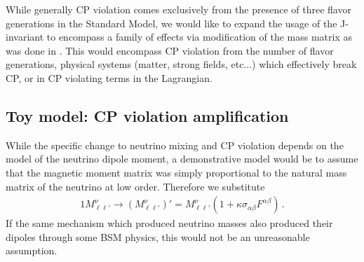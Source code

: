 While generally CP violation comes exclusively from the presence of three flavor generations in the Standard Model, we would like to expand the usage of the J-invariant to encompass a family of effects via modification of the mass matrix as was done in . This would encompass CP violation from the number of flavor generations, physical systems (matter, strong fields, etc...) which effectively break CP, or in CP violating terms in the Lagrangian.

\subsection{Toy model: CP violation amplification}
\label{sec:amp}
\noindent While the specific change to neutrino mixing and CP violation depends on the model of the neutrino dipole moment, a demonstrative model would be to assume that the magnetic moment matrix was simply proportional to the natural mass matrix of the neutrino at low order. Therefore we substitute
\begin{alignat}{1}
	\label{simplek:1} M_{\ell\ell'}^{\nu}\rightarrow
    (M_{\ell\ell'}^{\nu})'=M_{\ell\ell'}^{\nu}(1+\kappa\sigma_{\alpha\beta}F^{\alpha\beta})\,.
\end{alignat}
If the same mechanism which produced neutrino masses also produced their dipoles through some BSM physics, this would not be an unreasonable assumption.

